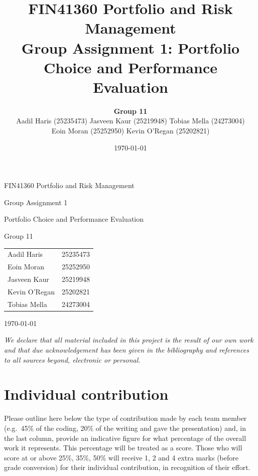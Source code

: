 \documentclass[11pt,a4paper]{article}
\title{FIN41360 Portfolio and Risk Management\\
\large Group Assignment 1: Portfolio Choice and Performance Evaluation}
\author{\textbf{Group 11}\\[0.4em]
\footnotesize Aadil Haris (25235473) \quad Jasveen Kaur (25219948) \quad Tobias Mella (24273004)\\[0.2em]
\footnotesize Eoin Moran (25252950) \quad Kevin O'Regan (25202821)}
\date{\today}
\begin{document}
\raggedright
\hypersetup{pageanchor=false}
\begin{titlepage}
\centering
\vspace*{3cm}
{\Large FIN41360 Portfolio and Risk Management\par}
\vspace{0.6cm}
{\LARGE Group Assignment 1\par}
\vspace{0.3cm}
{\Large Portfolio Choice and Performance Evaluation\par}
\vspace{1.5cm}
{\large Group 11\par}
\vspace{1cm}
\begin{tabular}{ll}
Aadil Haris & 25235473 \\
Eoin Moran & 25252950 \\
Jasveen Kaur & 25219948 \\
Kevin O'Regan & 25202821 \\
Tobias Mella & 24273004 \\
\end{tabular}
\vfill
{\large \today\par}
\end{titlepage}

\clearpage
\thispagestyle{plain}

\noindent
\textit{We declare that all material included in this project is the result of our own work and that due acknowledgement has been given in the bibliography and references to all sources beyond, electronic or personal.}

\vspace{1em}

\section*{Individual contribution}

\noindent
Please outline here below the type of contribution made by each team member (e.g.\ 45\% of the coding, 20\% of the writing and gave the presentation) and, in the last column, provide an indicative figure for what percentage of the overall work it represents. This percentage will be treated as a score. Those who will score at or above 25\%, 35\%, 50\% will receive 1, 2 and 4 extra marks (before grade conversion) for their individual contribution, in recognition of their effort.

\vspace{1em}
\end{document}
